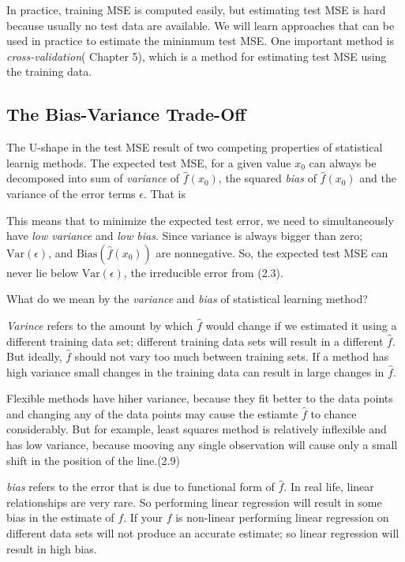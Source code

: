 \documentclass[
  letterpaper,
  DIV=11,
  numbers=noendperiod]{scrreprt}
\begin{document}
In practice, training MSE is computed easily, but estimating test MSE is
hard because usually no test data are available. We will learn
approaches that can be used in practice to estimate the mininmum test
MSE. One important method is \emph{cross-validation}( Chapter 5), which
is a method for estimating test MSE using the training data.

\hypertarget{the-bias-variance-trade-off}{%
\subsection{The Bias-Variance
Trade-Off}\label{the-bias-variance-trade-off}}

The U-shape in the test MSE result of two competing properties of
statistical learnig methods. The expected test MSE, for a given value
\(x_0\) can always be decomposed into sum of \emph{variance} of
\(\hat{f}(x_0)\), the squared \emph{bias} of \(\hat{f}(x_0)\) and the
variance of the error terms \(\epsilon\). That is

This means that to minimize the expected test error, we need to
simultaneously have \emph{low variance} and \emph{low bias}. Since
variance is always bigger than zero; \(\text{Var}(\epsilon)\), and
\(\text{Bias}(\hat{f}(x_0))\) are nonnegative. So, the expected test MSE
can never lie below \(\text{Var}(\epsilon)\), the irreducible error from
(2.3).

What do we mean by the \emph{variance} and \emph{bias} of statistical
learning method?

\emph{Varince} refers to the amount by which \(\hat{f}\) would change if
we estimated it using a different training data set; different training
data sets will result in a different \(\hat{f}\). But ideally,
\(\hat{f}\) should not vary too much between training sets. If a method
has high variance small changes in the training data can result in large
changes in \(\hat{f}\).

Flexible methods have hiher variance, because they fit better to the
data points and changing any of the data points may cause the estiamte
\(\hat{f}\) to chance considerably. But for example, least squares
method is relatively inflexible and has low variance, because mooving
any single observation will cause only a small shift in the position of
the line.(2.9)

\emph{bias} refers to the error that is due to functional form of
\(\hat{f}\). In real life, linear relationships are very rare. So
performing linear regression will result in some bias in the estimate of
\(f\). If your \(f\) is non-linear performing linear regression on
different data sets will not produce an accurate estimate; so linear
regression will result in high bias.
\end{document}
